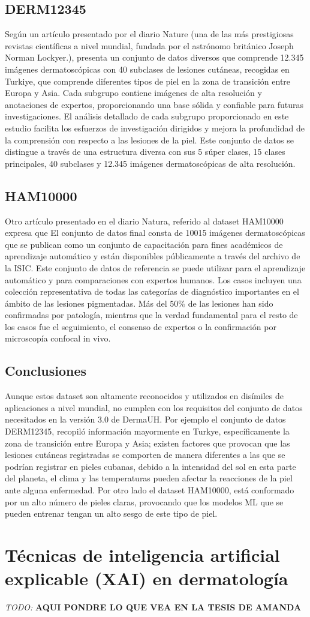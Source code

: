 \subsection{DERM12345}
Seg\'un un art\'iculo presentado por el diario Nature (una de las más prestigiosas revistas 
científicas a nivel mundial, fundada por el astrónomo británico Joseph Norman Lockyer.),
presenta un conjunto de datos diversos que comprende 12.345 imágenes dermatoscópicas 
con 40 subclases de lesiones cutáneas, recogidas en Turkiye, que comprende diferentes 
tipos de piel en la zona de transición entre Europa y Asia. Cada subgrupo contiene 
imágenes de alta resolución y anotaciones de expertos, proporcionando una base sólida y 
confiable para futuras investigaciones. El análisis detallado de cada subgrupo 
proporcionado en este estudio facilita los esfuerzos de investigación dirigidos y 
mejora la profundidad de la comprensión con respecto a las lesiones de la piel. 
Este conjunto de datos se distingue a través de una estructura diversa con sus 5 súper 
clases, 15 clases principales, 40 subclases y 12.345 imágenes dermatoscópicas de alta 
resolución\cite{Derm12345}.

\subsection{HAM10000}
Otro art\'iculo presentado en el diario Natura, referido al dataset HAM10000 expresa que
El conjunto de datos final consta de 10015 imágenes dermatoscópicas que se publican como 
un conjunto de capacitación para fines académicos de aprendizaje automático y están 
disponibles públicamente a través del archivo de la ISIC. Este conjunto de datos de 
referencia se puede utilizar para el aprendizaje automático y para comparaciones con 
expertos humanos. Los casos incluyen una colección representativa de todas las categorías 
de diagnóstico importantes en el ámbito de las lesiones pigmentadas. Más del $50\%$ 
de las lesiones han sido confirmadas por patología, mientras que la verdad fundamental 
para el resto de los casos fue el seguimiento, el consenso de expertos o la confirmación 
por microscopía confocal in vivo.

\subsection{Conclusiones}
Aunque estos dataset son altamente reconocidos y utilizados en dis\'imiles de aplicaciones
a nivel mundial, no cumplen con los requisitos del conjunto de datos necesitados en la versi\'on 3.0
de DermaUH. Por ejemplo el conjunto de datos DERM12345, recopil\'o informaci\'on mayormente
en Turkye, espec\'ificamente la zona de transici\'on entre Europa y Asia; existen factores que 
provocan que las lesiones cut\'aneas registradas se comporten de manera diferentes a las que 
se podr\'ian registrar en pieles cubanas, debido a la intensidad del sol en esta parte del planeta,
el clima y las temperaturas pueden afectar la reacciones de la piel ante alguna enfermedad. 
Por otro lado el dataset HAM10000, est\'a conformado por un alto n\'umero de pieles claras,
provocando que los modelos ML que se pueden entrenar tengan un alto sesgo de este tipo de piel.

\section{Técnicas de inteligencia artificial explicable (XAI) en dermatología}
\textit{TODO:} \textbf{AQUI PONDRE LO QUE VEA EN LA TESIS DE AMANDA}